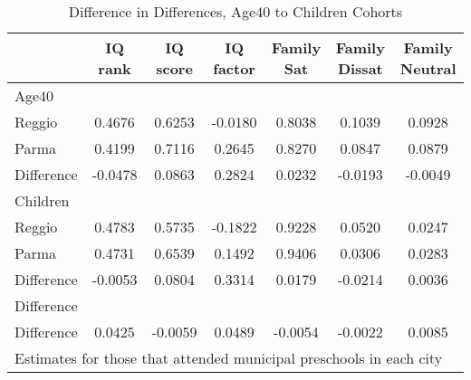 \begin{table}[htbp]\centering
\caption{Difference in Differences, Age40 to Children Cohorts}
\begin{tabular}{l*{6}{c}}
\hline\hline
            &     IQ rank&    IQ score&   IQ factor&  Family Sat&Family Dissat&Family Neutral\\
\hline
Age40       &            &            &            &            &            &            \\
Reggio      &      0.4676&      0.6253&     -0.0180&      0.8038&      0.1039&      0.0928\\
Parma       &      0.4199&      0.7116&      0.2645&      0.8270&      0.0847&      0.0879\\
Difference  &     -0.0478&      0.0863&      0.2824&      0.0232&     -0.0193&     -0.0049\\
\hline
Children    &            &            &            &            &            &            \\
Reggio      &      0.4783&      0.5735&     -0.1822&      0.9228&      0.0520&      0.0247\\
Parma       &      0.4731&      0.6539&      0.1492&      0.9406&      0.0306&      0.0283\\
Difference  &     -0.0053&      0.0804&      0.3314&      0.0179&     -0.0214&      0.0036\\
\hline
Difference  &            &            &            &            &            &            \\
Difference  &      0.0425&     -0.0059&      0.0489&     -0.0054&     -0.0022&      0.0085\\
\hline\hline
\multicolumn{7}{l}{\footnotesize Estimates for those that attended municipal preschools in each city}\\
\end{tabular}
\end{table}
